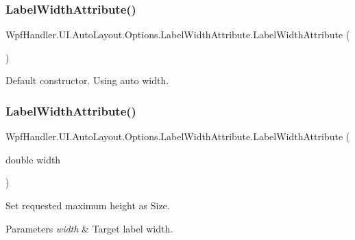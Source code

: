 \subsubsection{\texorpdfstring{Label\+Width\+Attribute()}{LabelWidthAttribute()}\hspace{0.1cm}{\footnotesize\ttfamily [1/2]}}
{\footnotesize\ttfamily Wpf\+Handler.\+U\+I.\+Auto\+Layout.\+Options.\+Label\+Width\+Attribute.\+Label\+Width\+Attribute (\begin{DoxyParamCaption}{ }\end{DoxyParamCaption})}



Default constructor. Using auto width. 

\mbox{\label{class_wpf_handler_1_1_u_i_1_1_auto_layout_1_1_options_1_1_label_width_attribute_a24991b7cdbc8d575106a41fd7573ad92}} 
\subsubsection{\texorpdfstring{Label\+Width\+Attribute()}{LabelWidthAttribute()}\hspace{0.1cm}{\footnotesize\ttfamily [2/2]}}
{\footnotesize\ttfamily Wpf\+Handler.\+U\+I.\+Auto\+Layout.\+Options.\+Label\+Width\+Attribute.\+Label\+Width\+Attribute (\begin{DoxyParamCaption}\item[{double}]{width }\end{DoxyParamCaption})}



Set requested maximum height as Size. 


\begin{DoxyParams}{Parameters}
{\em width} & Target label width.\\
\hline
\end{DoxyParams}



